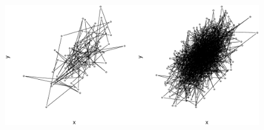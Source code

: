 \documentclass{beamer}
\begin{document}
\begin{frame}
  \begin{figure}
    \includegraphics[scale=.3]{gibbs2.eps}
  \end{figure}
\end{frame}

\end{document}
